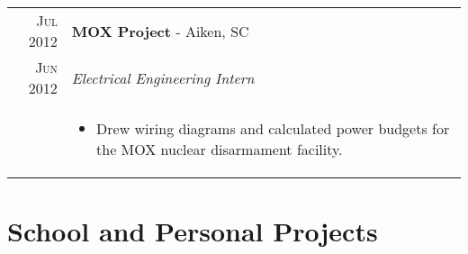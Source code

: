 \documentclass[a4paper,11pt]{article}
\begin{document}
\begin{tabularx}{\textwidth}{R|X}
   \textsc{Jul 2012} & \textbf{MOX Project} \-- Aiken, SC\\
   \textsc{Jun 2012} & \emph{Electrical Engineering Intern}\\
   & \small{
      \begin{itemize}[leftmargin=20pt,topsep=1pt,itemsep=1pt,partopsep=0pt, parsep=1pt]
         \item Drew wiring diagrams and calculated power budgets for the MOX nuclear disarmament facility.
      \vspace{-0.5cm}
      \end{itemize}}\\
\end{tabularx}

\hfill
\section{School and Personal Projects}
\end{document}
